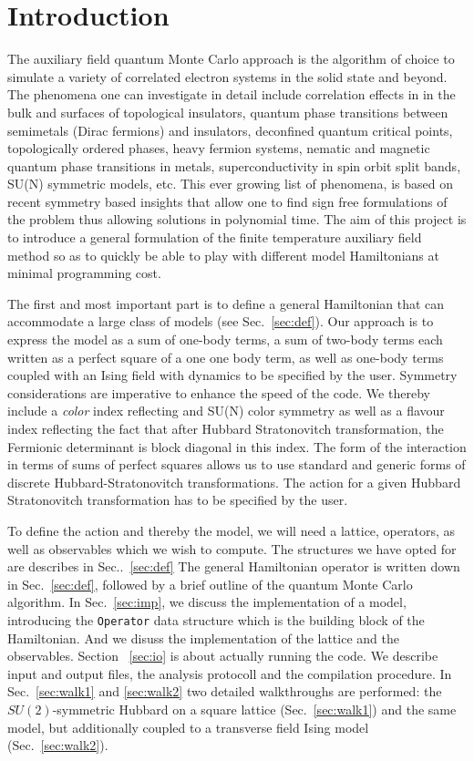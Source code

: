 \section{Introduction}\label{sec:intro}

The auxiliary field quantum Monte Carlo approach is the algorithm of choice to simulate a variety of correlated electron systems in the solid state and beyond.  The phenomena  one can investigate in detail include correlation effects in in the bulk and surfaces of topological insulators, quantum phase transitions between semimetals (Dirac fermions)  and insulators,  deconfined quantum critical points, topologically ordered phases, heavy fermion systems, nematic and magnetic quantum phase transitions in metals,   superconductivity in spin orbit split bands, SU(N) symmetric models,  etc.  This ever growing list of phenomena,  is based on  recent symmetry based insights that allow one to  find  sign free formulations of the  problem thus allowing solutions in polynomial time.    The aim of this project is to introduce a general formulation of the finite temperature  auxiliary field method  so as to quickly be able to play with different model Hamiltonians  at  minimal programming cost.  
	
		The first and most important  part is to define a general Hamiltonian  that  can  accommodate a large class of models  (see Sec.~\ref{sec:def}). Our approach is to express the model as a sum of one-body terms, a sum of two-body terms each written as a perfect square of a one one body term, as well as one-body terms  coupled with an Ising field with  dynamics to be specified by the user.   Symmetry considerations  are  imperative to enhance the speed of the code.   We thereby include a {\it color} index  reflecting  and SU(N) color symmetry as  well as a flavour index  reflecting  the fact that  after Hubbard Stratonovitch transformation,  the  Fermionic determinant is block diagonal in this index.     The form of the interaction in terms of sums of perfect squares allows us to use standard and generic forms of  discrete    Hubbard-Stratonovitch transformations.  The action for a given Hubbard Stratonovitch transformation  has to be specified by the user. 
		
               To define the action and thereby the model,  we will need a lattice, operators, as well as  observables  which we  wish to compute. The structures we have opted for are describes in Sec..~\ref{sec:def}
		 The general Hamiltonian operator is written down in Sec.~\ref{sec:def}, followed by 
a brief outline  of the quantum Monte Carlo algorithm. 
In Sec.~\ref{sec:imp}, we discuss the implementation of a model, introducing the \texttt{Operator} data structure which is the building block of the Hamiltonian. And we disuss the implementation of the lattice and the observables.
Section ~\ref{sec:io} is about actually running the code. We describe input and output files, the analysis protocoll and the compilation procedure. 
In Sec.~\ref{sec:walk1} and \ref{sec:walk2} two detailed walkthroughs are performed: the $SU(2)$-symmetric Hubbard  on a square lattice (Sec.~\ref{sec:walk1}) and the same model, but additionally coupled to a transverse field Ising model (Sec.~\ref{sec:walk2}).


